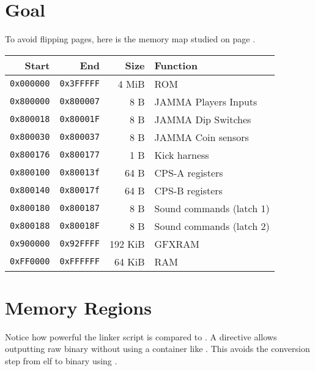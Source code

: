 \pagebreak

\section{Goal}
To avoid flipping pages, here is the memory map studied on page \pageref{m68k_mm}.

\begin{tabularx}{\textwidth}{rrrX}
\toprule    
  \textbf{Start } & \textbf{End  } & \textbf{Size } & \textbf{Function } \\               
  \toprule    
  \texttt{0x000000} & \texttt{0x3FFFFF} & 4 MiB & ROM \\
  \toprule    
  \texttt{0x800000} & \texttt{0x800007} & 8 B & JAMMA Players Inputs \\
  \texttt{0x800018} & \texttt{0x80001F} & 8 B & JAMMA Dip Switches \\
  \texttt{0x800030} & \texttt{0x800037} & 8 B & JAMMA Coin sensors \\
  \texttt{0x800176} & \texttt{0x800177} & 1 B & Kick harness \\
\toprule    
  \texttt{0x800100} & \texttt{0x80013f} & 64 B & CPS-A registers\\
  \texttt{0x800140} & \texttt{0x80017f} & 64 B & CPS-B registers\\
\toprule    
  \texttt{0x800180} & \texttt{0x800187} & 8 B & Sound commands (latch 1)\\
  \texttt{0x800188} & \texttt{0x80018F} & 8 B & Sound commands (latch 2)\\
  \toprule    
  \texttt{0x900000} & \texttt{0x92FFFF} & 192 KiB & GFXRAM\\
  \texttt{0xFF0000} & \texttt{0xFFFFFF} & 64 KiB & RAM \\
  \toprule    
\end{tabularx}%

\section{Memory Regions}



\begin{trivia}
Notice how powerful the linker script is compared to . A directive  allows outputting raw binary without using a container like . This avoids the conversion step from elf to binary using .
\end{trivia}


